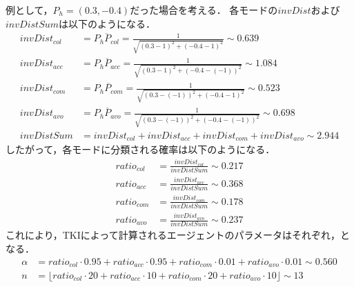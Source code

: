 例として，$P_h = (0.3, -0.4)$だった場合を考える．
各モードの$invDist$および$invDistSum$は以下のようになる．
\begin{align}
    invDist_{col} &= \overline{P_h P_{col}} = \frac{1}{\sqrt{(0.3 - 1)^2 + (-0.4 - 1)^2}} \sim 0.639 \nonumber\\
    invDist_{acc} &= \overline{P_h P_{acc}} = \frac{1}{\sqrt{(0.3 - 1)^2 + (-0.4 - (-1))^2}} \sim 1.084 \nonumber\\
    invDist_{com} &= \overline{P_h P_{com}} = \frac{1}{\sqrt{(0.3 - (-1))^2 + (-0.4 - 1)^2}} \sim 0.523 \nonumber\\
    invDist_{avo} &= \overline{P_h P_{avo}} = \frac{1}{\sqrt{(0.3 - (-1))^2 + (-0.4 - (-1))^2}} \sim 0.698 \nonumber\\
    invDistSum &= invDist_{col} + invDist_{acc} + invDist_{com} + invDist_{avo} \sim 2.944 \nonumber
\end{align}
したがって，各モードに分類される確率は以下のようになる．
\begin{align}
    ratio_{col} &= \frac{invDist_{col}}{invDistSum} \sim 0.217 \nonumber\\
    ratio_{acc} &= \frac{invDist_{acc}}{invDistSum} \sim 0.368 \nonumber\\
    ratio_{com} &= \frac{invDist_{com}}{invDistSum} \sim 0.178 \nonumber\\
    ratio_{avo} &= \frac{invDist_{avo}}{invDistSum} \sim 0.237 \nonumber
\end{align}
これにより，TKIによって計算されるエージェントのパラメータはそれぞれ，となる．
\begin{align}
    \alpha &= ratio_{col} \cdot 0.95 + ratio_{acc} \cdot 0.95 + ratio_{com} \cdot 0.01 + ratio_{avo} \cdot 0.01 \sim 0.560 \label{eq:tki-alpha} \\
    n &= \lfloor ratio_{col} \cdot 20 + ratio_{acc} \cdot 10 + ratio_{com} \cdot 20 + ratio_{avo} \cdot 10 \rfloor \sim 13 \label{eq:tki-n}
\end{align}

